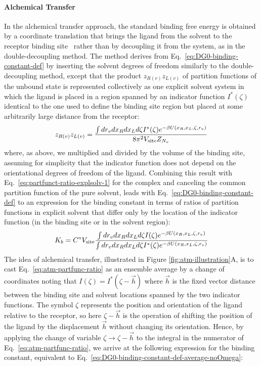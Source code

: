 \documentclass[9pt,bestpractices]{livecoms}
\begin{document}
\paragraph{Alchemical Transfer}

In the alchemical transfer approach, the standard binding free energy is obtained by a coordinate translation that brings the ligand from the solvent to the receptor binding site~\cite{wu2021alchemical} rather than by decoupling it from the system, as in the double-decoupling method. The method derives from Eq.~\ref{eq:DG0-binding-constant-def} by inserting the solvent degrees of freedom similarly to the double-decoupling method, except that the product $z_{R(v)} z_{L(v)}$ of partition functions of the unbound state is represented collectively as one explicit solvent system in which the ligand is placed in a region spanned by an indicator function $I^\ast(\zeta)$ identical to the one used to define the binding site region but placed at some arbitrarily large distance from the receptor:
\begin{equation}
  z_{R(v)} z_{L(v)} =
  \frac{
    \int dr_v dx_R dx_L d\zeta I^\ast(\zeta) e^{-\beta U(x_R, x_L, \zeta, r_v)}
  }{
    8 \pi^2 V_{\rm site} Z_{N_v}
  }
\end{equation}
where, as above, we multiplied and divided by the volume of the binding site, assuming for simplicity that the indicator function does not depend on the orientational degrees of freedom of the ligand. Combining this result with Eq.~\ref{eq:partfunct-ratio-explsolv-1} for the complex and canceling the common partition function of the pure solvent, leads with Eq.~\ref{eq:DG0-binding-constant-def}  to an expression for the binding constant in terms of ratios of partition functions in explicit solvent that differ only by the location of the indicator function (in the binding site or in the solvent region):
\begin{equation}\label{eq:atm-partfunc-ratio}
  K_b = C^\circ V_{\rm site} \frac{
    \int dr_v dx_R dx_L d\zeta I(\zeta) e^{-\beta U(x_R, x_L, \zeta, r_v)}
  }{
    \int dr_v dx_R dx_L d\zeta I^\ast(\zeta) e^{-\beta U(x_R, x_L, \zeta, r_v)}
  }
\end{equation}
The idea of alchemical transfer, illustrated in Figure \ref{fig:atm-illustration}A, is to cast Eq.~\ref{eq:atm-partfunc-ratio} as an ensemble average by a change of coordinates noting that $I(\zeta) = I^\ast(\zeta - \vec{h})$ where $\vec{h}$ is the fixed vector distance between the binding site and solvent locations spanned by the two indicator functions. The symbol $\zeta$ represents the position and orientation of the ligand relative to the receptor, so here $\zeta - \vec{h}$ is the operation of shifting the position of the ligand by the displacement $\vec{h}$ without changing its orientation. Hence, by applying the change of variable $\zeta \rightarrow \zeta - \vec{h}$ to the integral in the numerator of Eq.~\ref{eq:atm-partfunc-ratio}, we arrive at the following expression for the binding constant, equivalent to Eq.~\ref{eq:DG0-binding-constant-def-average-noOmega}:
\end{document}
